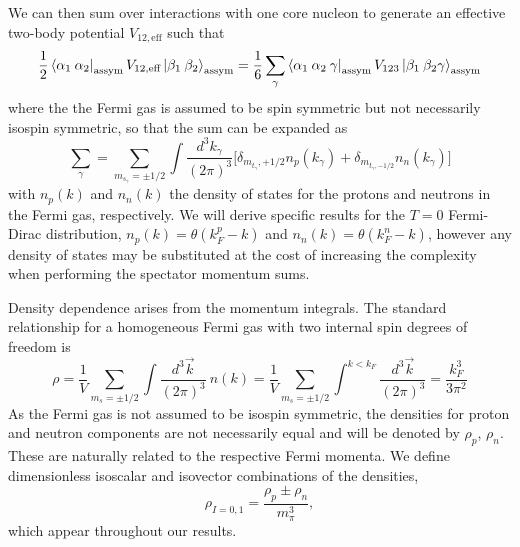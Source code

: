 We can then sum over interactions with one core nucleon to generate an effective two-body potential $V_{12,\text{eff}}$ such that
\begin{equation}
\frac{1}{2} \bra{\alpha_1\:\alpha_2}_{\text{assym}}  V_{12,\text{eff}}\ket{\beta_1 \:\beta_2 }_{\text{assym}}=\frac{1}{6} \sum_{\gamma} \bra{\alpha_1\:\alpha_2 \: \gamma}_{\text{assym}} V_{123}  \ket{\beta_1 \:\beta_2 \gamma}_{\text{assym}}
\end{equation}
where the the Fermi gas is assumed to be spin symmetric but not necessarily isospin symmetric, so that the sum can be expanded as
\begin{equation}\label{eq:fullSum}
\sum_\gamma=\sum_{m_{s_\gamma}=\pm 1/2}\int \frac{d^3k_\gamma}{(2\pi)^3} \Big[\delta_{m_{t_\gamma},+1/2} n_p(k_\gamma) +\delta_{m_{t_\gamma,-1/2}} n_n(k_\gamma) \Big]
\end{equation}
with $n_p(k)$ and $n_n(k)$ the density of states for the protons and neutrons in the Fermi gas, respectively. We will derive specific results for the $T=0$ Fermi-Dirac distribution, $n_p(k)=\theta(k_{F}^{p}-k)$ and $n_n(k)=\theta(k_{F}^{n}-k)$, however any density of states may be substituted at the cost of increasing the complexity when performing the spectator momentum sums.

Density dependence arises from the momentum integrals. The standard relationship for a homogeneous Fermi gas with two internal spin degrees of freedom is 
\begin{equation}\label{eq:kF}
\rho=\frac{1}{V}\sum_{m_{s}=\pm 1/2}\int \frac{d^3\vec{k}}{(2\pi)^3}\:n(k)
=\frac{1}{V}\sum_{m_{s}=\pm 1/2}\int^{k<k_F}\frac{d^3\vec{k}}{(2\pi)^3}=\frac{k_F^3}{3\pi^2}
\end{equation}
As the Fermi gas is not assumed to be isospin symmetric, the densities for proton and neutron components are not necessarily equal and will be denoted by $\rho_p$, $\rho_n$. These are naturally related to the respective Fermi momenta. We define dimensionless isoscalar and isovector combinations of the densities, 
\begin{equation}\label{eq:densities}
\rho_{I=0,1}=\frac{\rho_p\pm\rho_n}{m_\pi^3},
\end{equation}
which appear throughout our results.

